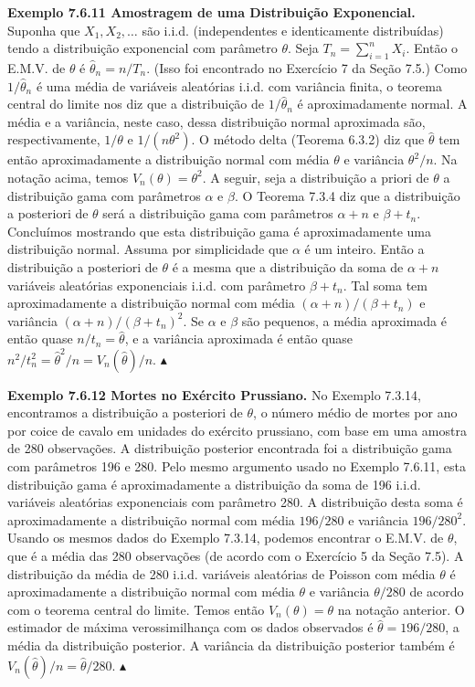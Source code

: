 \textbf{Exemplo 7.6.11 Amostragem de uma Distribuição Exponencial.} Suponha que $X_1, X_2, \dots$ são i.i.d. (independentes e identicamente distribuídas) tendo a distribuição exponencial com parâmetro $\theta$. Seja $T_n = \sum_{i=1}^{n} X_i$. Então o E.M.V. de $\theta$ é $\hat{\theta}_n = n/T_n$. (Isso foi encontrado no Exercício 7 da Seção 7.5.) Como $1/\hat{\theta}_n$ é uma média de variáveis aleatórias i.i.d. com variância finita, o teorema central do limite nos diz que a distribuição de $1/\hat{\theta}_n$ é aproximadamente normal. A média e a variância, neste caso, dessa distribuição normal aproximada são, respectivamente, $1/\theta$ e $1/(n\theta^2)$. O método delta (Teorema 6.3.2) diz que $\hat{\theta}$ tem então aproximadamente a distribuição normal com média $\theta$ e variância $\theta^2/n$. Na notação acima, temos $V_n(\theta) = \theta^2$.
A seguir, seja a distribuição a priori de $\theta$ a distribuição gama com parâmetros $\alpha$ e $\beta$. O Teorema 7.3.4 diz que a distribuição a posteriori de $\theta$ será a distribuição gama com parâmetros $\alpha+n$ e $\beta+t_n$. Concluímos mostrando que esta distribuição gama é aproximadamente uma distribuição normal. Assuma por simplicidade que $\alpha$ é um inteiro. Então a distribuição a posteriori de $\theta$ é a mesma que a distribuição da soma de $\alpha+n$ variáveis aleatórias exponenciais i.i.d. com parâmetro $\beta+t_n$. Tal soma tem aproximadamente a distribuição normal com média $(\alpha+n)/(\beta+t_n)$ e variância $(\alpha+n)/(\beta+t_n)^2$. Se $\alpha$ e $\beta$ são pequenos, a média aproximada é então quase $n/t_n = \hat{\theta}$, e a variância aproximada é então quase $n^2/t_n^2 = \hat{\theta}^2/n = V_n(\hat{\theta})/n$. $\blacktriangle$

\textbf{Exemplo 7.6.12 Mortes no Exército Prussiano.} No Exemplo 7.3.14, encontramos a distribuição a posteriori de $\theta$, o número médio de mortes por ano por coice de cavalo em unidades do exército prussiano, com base em uma amostra de 280 observações. A distribuição posterior encontrada foi a distribuição gama com parâmetros 196 e 280. Pelo mesmo argumento usado no Exemplo 7.6.11, esta distribuição gama é aproximadamente a distribuição da soma de 196 i.i.d. variáveis aleatórias exponenciais com parâmetro 280. A distribuição desta soma é aproximadamente a distribuição normal com média $196/280$ e variância $196/280^2$.
Usando os mesmos dados do Exemplo 7.3.14, podemos encontrar o E.M.V. de $\theta$, que é a média das 280 observações (de acordo com o Exercício 5 da Seção 7.5). A distribuição da média de 280 i.i.d. variáveis aleatórias de Poisson com média $\theta$ é aproximadamente a distribuição normal com média $\theta$ e variância $\theta/280$ de acordo com o teorema central do limite. Temos então $V_n(\theta) = \theta$ na notação anterior. O estimador de máxima verossimilhança com os dados observados é $\hat{\theta} = 196/280$, a média da distribuição posterior. A variância da distribuição posterior também é $V_n(\hat{\theta})/n = \hat{\theta}/280$. $\blacktriangle$


